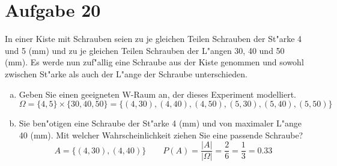 \section{Aufgabe 20}
\setcounter{section}{20}

In einer Kiste mit Schrauben seien zu je gleichen Teilen Schrauben der St"arke
4 und 5 (mm) und zu je gleichen Teilen Schrauben der L"angen 30, 40 und 50
(mm). Es werde nun zuf"allig eine Schraube aus der Kiste genommen und sowohl
zwischen St"arke als auch der L"ange der Schraube unterschieden.

\begin{enumerate}[(a)]
    \item Geben Sie einen geeigneten W-Raum an, der dieses Experiment modelliert.
        \begin{equation*}
            \Omega = \{4, 5\} \times \{30, 40, 50\} = \{(4, 30), (4, 40), (4, 50), (5, 30), (5, 40), (5, 50)\}
        \end{equation*}
    \item Sie ben"otigen eine Schraube der St"arke 4 (mm) und von maximaler L"ange 40 (mm).
        Mit welcher Wahrscheinlichkeit ziehen Sie eine passende Schraube?
        \begin{equation*}
            A = \{(4, 30), (4, 40)\} \quad\quad
            P(A) = \dfrac{|A|}{|\Omega|} = \dfrac{2}{6} = \dfrac{1}{3} = 0.33
        \end{equation*}
\end{enumerate}

